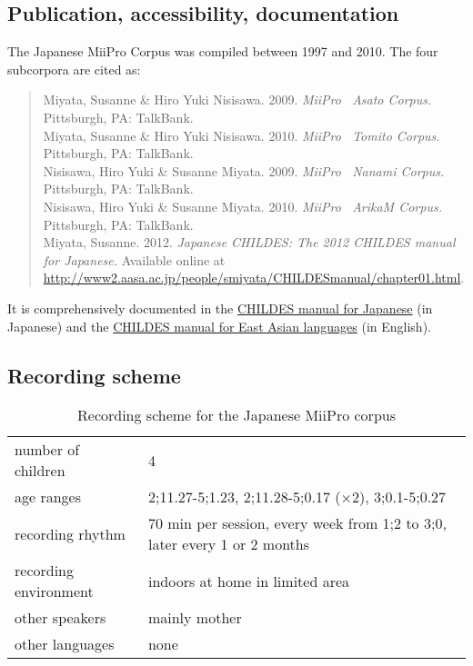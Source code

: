 \documentclass[a4paper, 11pt]{book}
\begin{document}
\subsection{Publication, accessibility, documentation}
The Japanese MiiPro Corpus \citep{Miyata_etal2009a, Nisisawa_etal2009a, Miyata_etal2010a, Nisisawa_etal2010a, Miyata2012a} was compiled between 1997 and 2010. The four subcorpora are cited as:

\begin{quote}
	Miyata, Susanne \& Hiro Yuki Nisisawa. 2009. \emph{MiiPro \textendash\ Asato Corpus.} Pittsburgh, PA: TalkBank. \\ %
	Miyata, Susanne \& Hiro Yuki Nisisawa. 2010. \emph{MiiPro \textendash\ Tomito Corpus.} Pittsburgh, PA: TalkBank. \\ %
	Nisisawa, Hiro Yuki \& Susanne Miyata. 2009. \emph{MiiPro \textendash\ Nanami Corpus.} Pittsburgh, PA: TalkBank. \\ %
	Nisisawa, Hiro Yuki \& Susanne Miyata. 2010. \emph{MiiPro \textendash\ ArikaM Corpus.} Pittsburgh, PA: TalkBank. \\ %
	Miyata, Susanne. 2012. \emph{Japanese CHILDES: The 2012 CHILDES manual for Japanese.} Available online at \url{http://www2.aasa.ac.jp/people/smiyata/CHILDESmanual/chapter01.html}.
\end{quote}

It is comprehensively documented in the \href{http://www2.aasa.ac.jp/people/smiyata/CHILDESmanual/chapter01.html}{CHILDES manual for Japanese} (in Japanese) and the \href{http://childes.psy.cmu.edu/manuals/10eastasian.pdf}{CHILDES manual for East Asian languages} (in English). 

\subsection{Recording scheme}

\begin{table}[ht]
	\centering
	\begin{tabular}{ll}
		\toprule
		number of children 	& 4 \\
		age ranges 			& 2;11.27-5;1.23, 2;11.28-5;0.17 (×2), 3;0.1-5;0.27 \\
		recording rhythm 	& 70 min per session, every week from 1;2 to 3;0, later every 1 or 2 months \\
		recording environment & indoors at home in limited area \\
		other speakers 		& mainly mother \\
		other languages		& none \\
		\bottomrule
	\end{tabular}
	\caption{Recording scheme for the Japanese MiiPro corpus}
	\label{tab:Japanese MiiPro recording scheme}
\end{table}
\end{document}
